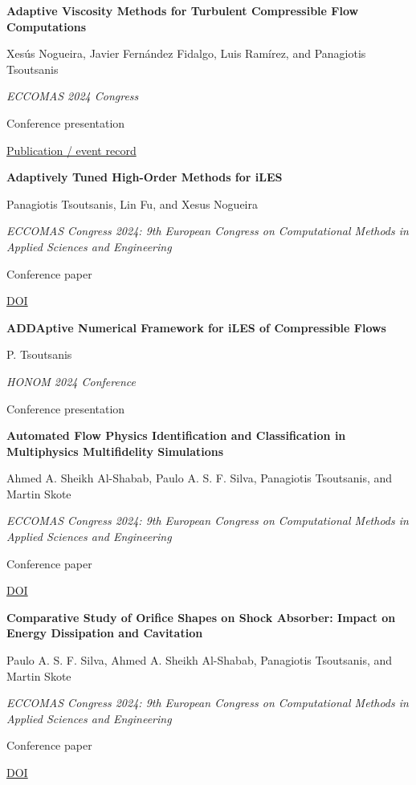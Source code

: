 \documentclass[11pt,a4paper]{article}
\newlength{\cventrysep}
\newenvironment{cventry}{%
  \par\noindent\begin{minipage}{\linewidth}
  \RaggedRight\fontsize{9.8}{12.5}\selectfont
}{\end{minipage}\par\addvspace{\cventrysep}}
\newcommand{\cvtitle}[1]{{\bfseries #1\par}\vspace{1pt}}
\newcommand{\cvdetail}[1]{{#1\par}\vspace{1pt}}
\newcommand{\cvmeta}[1]{{\fontsize{9}{11.5}\selectfont\color{Muted}#1\par}\vspace{1pt}}
\newcommand{\cvlinks}[1]{{\fontsize{9}{11.5}\selectfont #1\par}}
\begin{document}
\begin{cventry}
\cvtitle{Adaptive Viscosity Methods for Turbulent Compressible Flow Computations}
\cvdetail{Xesús Nogueira, Javier Fernández Fidalgo, Luis Ramírez, and Panagiotis Tsoutsanis}
\cvmeta{\textit{ECCOMAS 2024 Congress}\par Conference presentation}
\cvlinks{\href{https://eccomas2024.org/event/contribution/f74e4a05-aaef-11ee-ac5b-000c29ddfc0c}{Publication / event record}}
\end{cventry}

\begin{cventry}
\cvtitle{Adaptively Tuned High-Order Methods for iLES}
\cvdetail{Panagiotis Tsoutsanis, Lin Fu, and Xesus Nogueira}
\cvmeta{\textit{ECCOMAS Congress 2024: 9th European Congress on Computational Methods in Applied Sciences and Engineering}\par Conference paper}
\cvlinks{\href{https://doi.org/10.23967/eccomas.2024.040}{DOI}}
\end{cventry}

\begin{cventry}
\cvtitle{ADDAptive Numerical Framework for iLES of Compressible Flows}
\cvdetail{P. Tsoutsanis}
\cvmeta{\textit{HONOM 2024 Conference}\par Conference presentation}
\end{cventry}

\begin{cventry}
\cvtitle{Automated Flow Physics Identification and Classification in Multiphysics Multifidelity Simulations}
\cvdetail{Ahmed A. Sheikh Al-Shabab, Paulo A. S. F. Silva, Panagiotis Tsoutsanis, and Martin Skote}
\cvmeta{\textit{ECCOMAS Congress 2024: 9th European Congress on Computational Methods in Applied Sciences and Engineering}\par Conference paper}
\cvlinks{\href{https://doi.org/10.23967/eccomas.2024.072}{DOI}}
\end{cventry}

\begin{cventry}
\cvtitle{Comparative Study of Orifice Shapes on Shock Absorber: Impact on Energy Dissipation and Cavitation}
\cvdetail{Paulo A. S. F. Silva, Ahmed A. Sheikh Al-Shabab, Panagiotis Tsoutsanis, and Martin Skote}
\cvmeta{\textit{ECCOMAS Congress 2024: 9th European Congress on Computational Methods in Applied Sciences and Engineering}\par Conference paper}
\cvlinks{\href{https://doi.org/10.23967/eccomas.2024.073}{DOI}}
\end{cventry}
\end{document}
